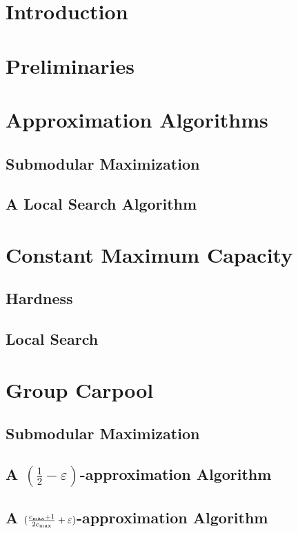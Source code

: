 \begin{abstract}

\end{abstract}

\section{Introduction}


\section{Preliminaries}
\label{sec:pre}


\section{Approximation Algorithms}
\label{sec:approx}


\subsection{Submodular Maximization}
\label{sec:sub}


\subsection{A Local Search Algorithm}


\section{Constant Maximum Capacity}

	\subsection{Hardness}
	\label{sec:hardness}
	

	\subsection{Local Search}
	\label{sec:local}
	

\section{Group Carpool}
\label{sec:group}

	\subsection{Submodular Maximization}
	
	
	\subsection{A \texorpdfstring{$(\frac{1}{2} - \varepsilon)$}--approximation
	Algorithm}
	
	
	\subsection{A \texorpdfstring{$(\frac{c_{\max}+1}{2c_{\max}} + \varepsilon)$}--approximation
	Algorithm}
	

